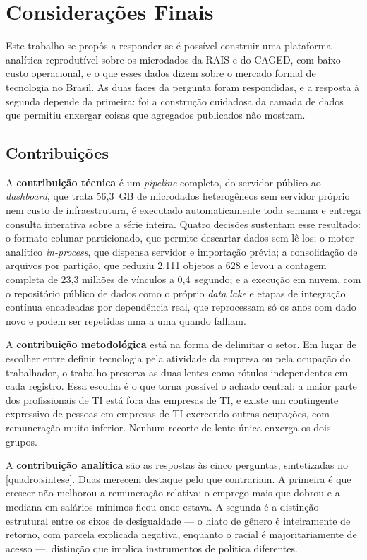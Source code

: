 
\chapter{Considerações Finais}
\label{cap:consideracoes}

Este trabalho se propôs a responder se é possível construir uma plataforma analítica reprodutível sobre os microdados da RAIS e do CAGED, com baixo custo operacional, e o que esses dados dizem sobre o mercado formal de tecnologia no Brasil. As duas faces da pergunta foram respondidas, e a resposta à segunda depende da primeira: foi a construção cuidadosa da camada de dados que permitiu enxergar coisas que agregados publicados não mostram.

\section{Contribuições}

A \textbf{contribuição técnica} é um \textit{pipeline} completo, do servidor público ao \textit{dashboard}, que trata 56,3~GB de microdados heterogêneos sem servidor próprio nem custo de infraestrutura, é executado automaticamente toda semana e entrega consulta interativa sobre a série inteira. Quatro decisões sustentam esse resultado: o formato colunar particionado, que permite descartar dados sem lê-los; o motor analítico \textit{in-process}, que dispensa servidor e importação prévia; a consolidação de arquivos por partição, que reduziu 2.111 objetos a 628 e levou a contagem completa de 23,3 milhões de vínculos a 0,4~segundo; e a execução em nuvem, com o repositório público de dados como o próprio \textit{data lake} e etapas de integração contínua encadeadas por dependência real, que reprocessam só os anos com dado novo e podem ser repetidas uma a uma quando falham.

A \textbf{contribuição metodológica} está na forma de delimitar o setor. Em lugar de escolher entre definir tecnologia pela atividade da empresa ou pela ocupação do trabalhador, o trabalho preserva as duas lentes como rótulos independentes em cada registro. Essa escolha é o que torna possível o achado central: a maior parte dos profissionais de TI está fora das empresas de TI, e existe um contingente expressivo de pessoas em empresas de TI exercendo outras ocupações, com remuneração muito inferior. Nenhum recorte de lente única enxerga os dois grupos.

A \textbf{contribuição analítica} são as respostas às cinco perguntas, sintetizadas no \autoref{quadro:sintese}. Duas merecem destaque pelo que contrariam. A primeira é que crescer não melhorou a remuneração relativa: o emprego mais que dobrou e a mediana em salários mínimos ficou onde estava. A segunda é a distinção estrutural entre os eixos de desigualdade --- o hiato de gênero é inteiramente de retorno, com parcela explicada negativa, enquanto o racial é majoritariamente de acesso ---, distinção que implica instrumentos de política diferentes.

